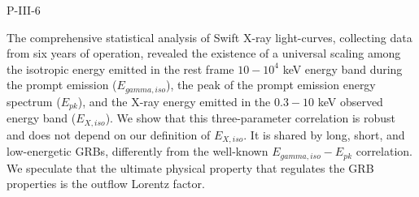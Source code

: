 P-III-6


\bigskip



\bigskip

\noindent The comprehensive statistical analysis of Swift X-ray light-curves, collecting data from six years of operation, revealed the existence of a universal scaling among the isotropic energy emitted in the rest frame $10-10^4$ keV energy band during the prompt emission ($E_{gamma,iso}$), the peak of the prompt emission energy spectrum ($E_{pk}$), and the X-ray energy emitted in the $0.3-10$ keV observed energy band ($E_{X,iso}$). We show that this three-parameter correlation is robust and does not depend on our definition of $E_{X,iso}$. It is shared by long, short, and low-energetic GRBs, differently from the well-known $E_{gamma,iso}-E_{pk}$ correlation. We speculate that the ultimate physical property that regulates the GRB properties is the outflow Lorentz factor.

